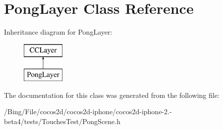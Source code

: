 \hypertarget{interface_pong_layer}{\section{Pong\-Layer Class Reference}
\label{interface_pong_layer}
}
Inheritance diagram for Pong\-Layer\-:\begin{figure}[H]
\begin{center}
\leavevmode
\includegraphics[height=2.000000cm]{interface_pong_layer}
\end{center}
\end{figure}


The documentation for this class was generated from the following file\-:\begin{DoxyCompactItemize}
\item 
/\-Bing/\-File/cocos2d/cocos2d-\/iphone/cocos2d-\/iphone-\/2.-\/beta4/tests/\-Touches\-Test/Pong\-Scene.\-h\end{DoxyCompactItemize}
